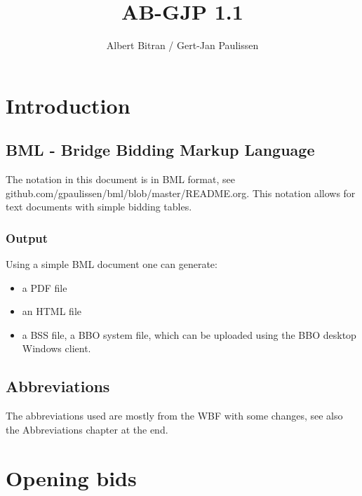 \documentclass[a4paper]{article}
\title{AB-GJP 1.1}
\author{Albert Bitran / Gert-Jan Paulissen}
\begin{document}
\maketitle
\tableofcontents

\section{Introduction}

\subsection{BML - Bridge Bidding Markup Language}

The notation in this document is in BML format, see
github.com/gpaulissen/bml/blob/master/README.org.
\bigbreak
This notation allows for text documents with simple bidding tables.
\bigbreak
\subsubsection{Output}

Using a simple BML document one can generate:
\bigbreak
\begin{itemize}
\item a PDF file

\item an HTML file

\item a BSS file, a BBO system file, which can be uploaded using the BBO desktop Windows client.

\end{itemize}
\bigbreak
\subsection{Abbreviations}

The abbreviations used are mostly from the WBF with some changes, see also the
Abbreviations chapter at the end.
\bigbreak
\section{Opening bids}
\end{document}
